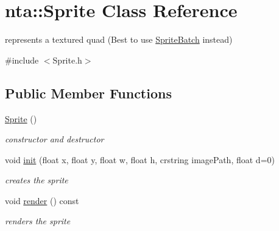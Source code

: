\hypertarget{classnta_1_1Sprite}{}\section{nta\+:\+:Sprite Class Reference}
\label{classnta_1_1Sprite}


represents a textured quad (Best to use \hyperlink{classnta_1_1SpriteBatch}{Sprite\+Batch} instead)  




{\ttfamily \#include $<$Sprite.\+h$>$}

\subsection*{Public Member Functions}
\begin{DoxyCompactItemize}
\item 
\mbox{\label{classnta_1_1Sprite_a5d208eb1b82f0a60155887b5f4103dbc}} 
\hyperlink{classnta_1_1Sprite_a5d208eb1b82f0a60155887b5f4103dbc}{Sprite} ()
\begin{DoxyCompactList}\small\item\em constructor and destructor \end{DoxyCompactList}\item 
void \hyperlink{classnta_1_1Sprite_a1054dba693836caca9e755acc530d2fd}{init} (float x, float y, float w, float h, crstring image\+Path, float d=0)
\begin{DoxyCompactList}\small\item\em creates the sprite \end{DoxyCompactList}\item 
\mbox{\label{classnta_1_1Sprite_a01e831cda46d73acd8a4eff3cb56d5d3}} 
void \hyperlink{classnta_1_1Sprite_a01e831cda46d73acd8a4eff3cb56d5d3}{render} () const
\begin{DoxyCompactList}\small\item\em renders the sprite \end{DoxyCompactList}\end{DoxyCompactItemize}
